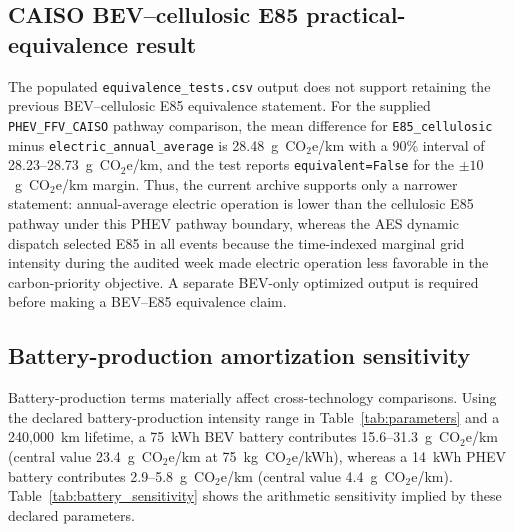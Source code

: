 \documentclass[cleantechnol,article,submit,pdftex,moreauthors]{Definitions/mdpi}
\newcommand{\gcoeqkm}{g~CO$_2$e/km}
\begin{document}
\subsection{CAISO BEV--cellulosic E85 practical-equivalence result}
\label{subsec:equivalence}

The populated \texttt{equivalence\_tests.csv} output does not support retaining the previous BEV--cellulosic E85 equivalence statement. For the supplied \texttt{PHEV\_FFV\_CAISO} pathway comparison, the mean difference for \texttt{E85\_cellulosic} minus \texttt{electric\_annual\_average} is 28.48~\gcoeqkm{} with a 90\% interval of 28.23--28.73~\gcoeqkm{}, and the test reports \texttt{equivalent=False} for the $\pm10$~\gcoeqkm{} margin. Thus, the current archive supports only a narrower statement: annual-average electric operation is lower than the cellulosic E85 pathway under this PHEV pathway boundary, whereas the AES dynamic dispatch selected E85 in all events because the time-indexed marginal grid intensity during the audited week made electric operation less favorable in the carbon-priority objective. A separate BEV-only optimized output is required before making a BEV--E85 equivalence claim.



\subsection{Battery-production amortization sensitivity}
\label{subsec:battery_sensitivity}

Battery-production terms materially affect cross-technology comparisons. Using the declared battery-production intensity range in Table~\ref{tab:parameters} and a 240,000~km lifetime, a 75~kWh BEV battery contributes 15.6--31.3~\gcoeqkm{} (central value 23.4~\gcoeqkm{} at 75~kg~CO$_2$e/kWh), whereas a 14~kWh PHEV battery contributes 2.9--5.8~\gcoeqkm{} (central value 4.4~\gcoeqkm{}). Table~\ref{tab:battery_sensitivity} shows the arithmetic sensitivity implied by these declared parameters.
\end{document}
